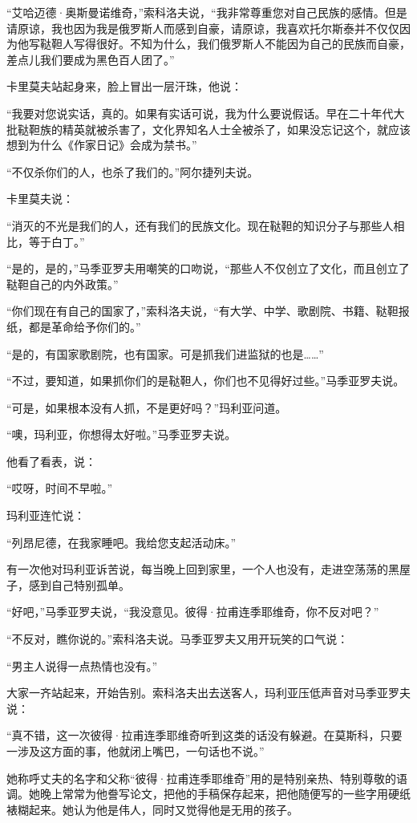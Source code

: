 “艾哈迈德·奥斯曼诺维奇，”索科洛夫说，“我非常尊重您对自己民族的感情。但是请原谅，我也因为我是俄罗斯人而感到自豪，请原谅，我喜欢托尔斯泰并不仅仅因为他写鞑靼人写得很好。不知为什么，我们俄罗斯人不能因为自己的民族而自豪，差点儿我们要成为黑色百人团了。”

卡里莫夫站起身来，脸上冒出一层汗珠，他说：

“我要对您说实话，真的。如果有实话可说，我为什么要说假话。早在二十年代大批鞑靼族的精英就被杀害了，文化界知名人士全被杀了，如果没忘记这个，就应该想到为什么《作家日记》会成为禁书。”

“不仅杀你们的人，也杀了我们的。”阿尔捷列夫说。

卡里莫夫说：

“消灭的不光是我们的人，还有我们的民族文化。现在鞑靼的知识分子与那些人相比，等于白丁。”

“是的，是的，”马季亚罗夫用嘲笑的口吻说，“那些人不仅创立了文化，而且创立了鞑靼自己的内外政策。”

“你们现在有自己的国家了，”索科洛夫说，“有大学、中学、歌剧院、书籍、鞑靼报纸，都是革命给予你们的。”

“是的，有国家歌剧院，也有国家。可是抓我们进监狱的也是……”

“不过，要知道，如果抓你们的是鞑靼人，你们也不见得好过些。”马季亚罗夫说。

“可是，如果根本没有人抓，不是更好吗？”玛利亚问道。

“噢，玛利亚，你想得太好啦。”马季亚罗夫说。

他看了看表，说：

“哎呀，时间不早啦。”

玛利亚连忙说：

“列昂尼德，在我家睡吧。我给您支起活动床。”

有一次他对玛利亚诉苦说，每当晚上回到家里，一个人也没有，走进空荡荡的黑屋子，感到自己特别孤单。

“好吧，”马季亚罗夫说，“我没意见。彼得·拉甫连季耶维奇，你不反对吧？”

“不反对，瞧你说的。”索科洛夫说。马季亚罗夫又用开玩笑的口气说：

“男主人说得一点热情也没有。”

大家一齐站起来，开始告别。索科洛夫出去送客人，玛利亚压低声音对马季亚罗夫说：

“真不错，这一次彼得·拉甫连季耶维奇听到这类的话没有躲避。在莫斯科，只要一涉及这方面的事，他就闭上嘴巴，一句话也不说。”

她称呼丈夫的名字和父称“彼得·拉甫连季耶维奇”用的是特别亲热、特别尊敬的语调。她晚上常常为他誊写论文，把他的手稿保存起来，把他随便写的一些字用硬纸裱糊起来。她认为他是伟人，同时又觉得他是无用的孩子。


